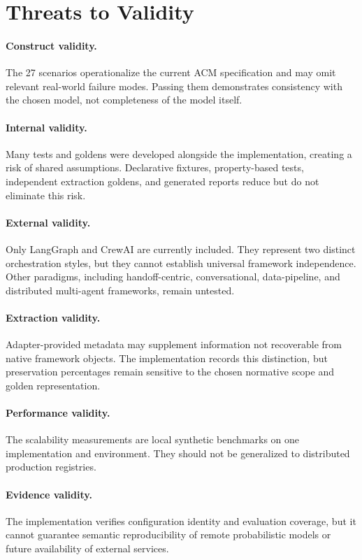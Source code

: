 \documentclass[10pt]{article}
\begin{document}
\section{Threats to Validity}
\label{sec:threats}

\paragraph{Construct validity.}
The 27 scenarios operationalize the current ACM specification and may omit relevant real-world failure modes. Passing them demonstrates consistency with the chosen model, not completeness of the model itself.

\paragraph{Internal validity.}
Many tests and goldens were developed alongside the implementation, creating a risk of shared assumptions. Declarative fixtures, property-based tests, independent extraction goldens, and generated reports reduce but do not eliminate this risk.

\paragraph{External validity.}
Only LangGraph and CrewAI are currently included. They represent two distinct orchestration styles, but they cannot establish universal framework independence. Other paradigms, including handoff-centric, conversational, data-pipeline, and distributed multi-agent frameworks, remain untested.

\paragraph{Extraction validity.}
Adapter-provided metadata may supplement information not recoverable from native framework objects. The implementation records this distinction, but preservation percentages remain sensitive to the chosen normative scope and golden representation.

\paragraph{Performance validity.}
The scalability measurements are local synthetic benchmarks on one implementation and environment. They should not be generalized to distributed production registries.

\paragraph{Evidence validity.}
The implementation verifies configuration identity and evaluation coverage, but it cannot guarantee semantic reproducibility of remote probabilistic models or future availability of external services.
\end{document}
